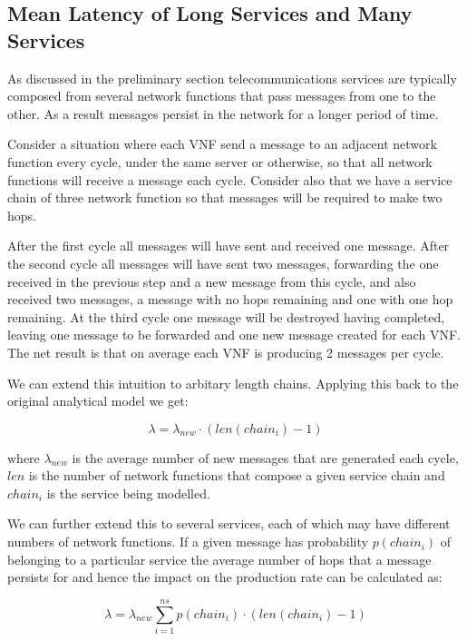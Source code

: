 \subsection{Mean Latency of Long Services and Many Services}
As discussed in the preliminary section telecommunications services are typically composed from several network functions that pass messages from one to the other. As a result messages persist in the network for a longer period of time. 

Consider a situation where each VNF send a message to an adjacent network function every cycle, under the same server or otherwise, so that all network functions will receive a message each cycle. Consider also that we have a service chain of three network function so that messages will be required to make two hops. 

After the first cycle all messages will have sent and received one message. After the second cycle all messages will have sent two messages, forwarding the one received in the previous step and a new message from this cycle, and also received two messages, a message with no hops remaining and one with one hop remaining. At the third cycle one message will be destroyed having completed, leaving one message to be forwarded and one new message created for each VNF. The net result is that on average each VNF is producing 2 messages per cycle.

We can extend this intuition to arbitary length chains. Applying this back to the original analytical model we get:

\begin{equation}
\lambda = \lambda_{new} \cdot (len(chain_i) - 1)
\end{equation}

where $\lambda_{new}$ is the average number of new messages that are generated each cycle, $len$ is the number of network functions that compose a given service chain and $chain_i$ is the service being modelled.

We can further extend this to several services, each of which may have different numbers of network functions. If a given message has probability $p(chain_i)$ of belonging to a particular service the average number of hops that a message persists for and hence the impact on the production rate can be calculated as:

\begin{equation}
\lambda = \lambda_{new} \sum_{i=1}^{ns} p(chain_i) \cdot (len(chain_i) - 1)
\end{equation}

